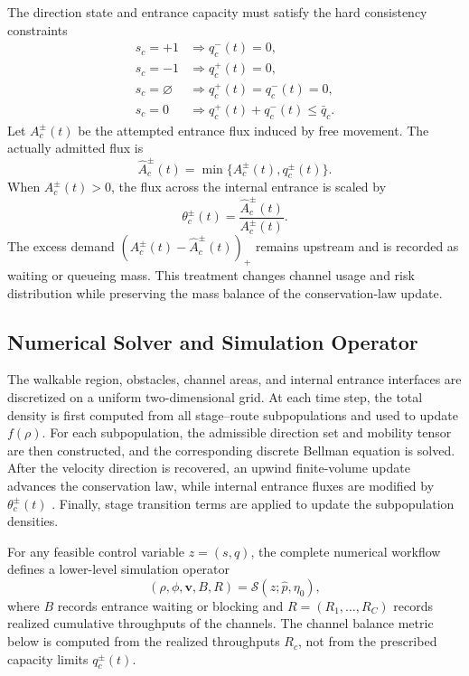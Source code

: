 \documentclass[lettersize,journal]{IEEEtran}
\begin{document}
The direction state and entrance capacity must satisfy the hard consistency constraints
\begin{equation}
\begin{aligned}
s_c=+1 &\Rightarrow q_c^-(t)=0,\\
s_c=-1 &\Rightarrow q_c^+(t)=0,\\
s_c=\varnothing &\Rightarrow q_c^+(t)=q_c^-(t)=0,\\
s_c=0 &\Rightarrow q_c^+(t)+q_c^-(t)\le \bar q_c.
\end{aligned}
\label{eq:direction_capacity_consistency}
\end{equation}
Let $A_c^\pm(t)$ be the attempted entrance flux induced by free movement.
The actually admitted flux is
\begin{equation}
\hat A_c^\pm(t)=\min\{A_c^\pm(t),q_c^\pm(t)\}.
\label{eq:admitted_flux}
\end{equation}
When $A_c^\pm(t)>0$, the flux across the internal entrance is scaled by
\begin{equation}
\theta_c^\pm(t)=\frac{\hat A_c^\pm(t)}{A_c^\pm(t)}.
\label{eq:flux_scaling}
\end{equation}
The excess demand $(A_c^\pm(t)-\hat A_c^\pm(t))_+$ remains upstream and is recorded as waiting or queueing mass.
This treatment changes channel usage and risk distribution while preserving the mass balance of the conservation-law update.

\subsection{Numerical Solver and Simulation Operator}
\label{sec:numerical}

The walkable region, obstacles, channel areas, and internal entrance interfaces are discretized on a uniform two-dimensional grid.
At each time step, the total density is first computed from all stage--route subpopulations and used to update $f(\rho)$.
For each subpopulation, the admissible direction set and mobility tensor are then constructed, and the corresponding discrete Bellman equation is solved.
After the velocity direction is recovered, an upwind finite-volume update advances the conservation law, while internal entrance fluxes are modified by $\theta_c^\pm(t)$ \cite{RN2078}.
Finally, stage transition terms are applied to update the subpopulation densities.

For any feasible control variable $z=(s,q)$, the complete numerical workflow defines a lower-level simulation operator
\begin{equation}
(\rho,\phi,\mathbf v,B,R)=\mathcal S(z;\hat p,\eta_0),
\label{eq:simulation_oracle}
\end{equation}
where $B$ records entrance waiting or blocking and $R=(R_1,\ldots,R_C)$ records realized cumulative throughputs of the channels.
The channel balance metric below is computed from the realized throughputs $R_c$, not from the prescribed capacity limits $q_c^\pm(t)$.
\end{document}
